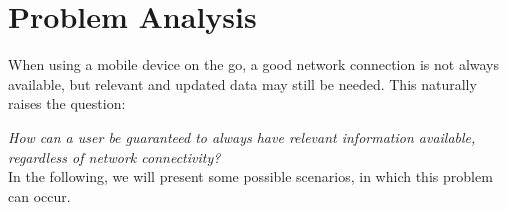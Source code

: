 \chapter{Problem Analysis}
\label{chap:prob}
When using a mobile device on the go, a good network connection is not always available, but relevant and updated data may still be needed. This naturally raises the question:

\textit{How can a user be guaranteed to always have relevant information available, regardless of network connectivity?}\\

\noindent In the following, we will present some possible scenarios, in which this problem can occur.



%


%

